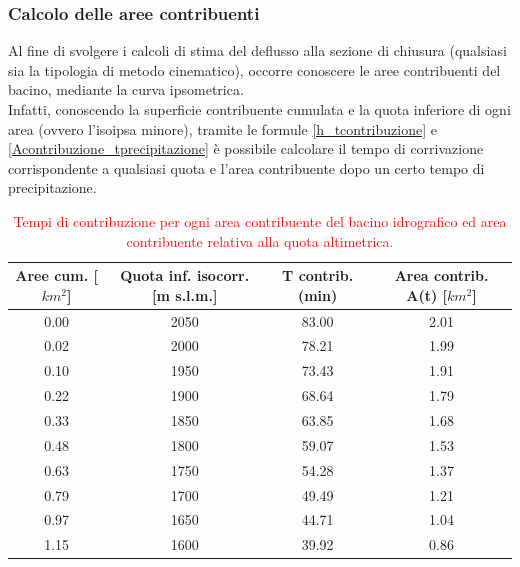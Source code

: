\subsubsection{Calcolo delle aree contribuenti}
Al fine di svolgere i calcoli di stima del deflusso alla sezione di chiusura (qualsiasi sia la tipologia di metodo cinematico), occorre conoscere le aree contribuenti del bacino, mediante la curva ipsometrica.\\
Infatti, conoscendo la superficie contribuente cumulata e la quota inferiore di ogni area (ovvero l'isoipsa minore), tramite le formule \ref{h_tcontribuzione} e \ref{Acontribuzione_tprecipitazione} è possibile calcolare il tempo di corrivazione corrispondente a qualsiasi quota e l'area contribuente dopo un certo tempo di precipitazione.
\begin{table}[H] \centering
\caption{\textcolor{red}{Tempi di contribuzione per ogni area contribuente del bacino idrografico ed area contribuente relativa alla quota altimetrica.}}
    \begin{tabular}{cccc}
\toprule
Aree cum. [$km^2$]& Quota inf. isocorr. [m s.l.m.] &  T contrib. (min) & Area contrib. A(t) [$km^2$] \\
\midrule
    0.00          & 2050                       & 83.00                       & 2.01                   \\
    0.02          & 2000                       & 78.21                       & 1.99                   \\
    0.10          & 1950                       & 73.43                       & 1.91                   \\
    0.22          & 1900                       & 68.64                       & 1.79                   \\
    0.33          & 1850                       & 63.85                       & 1.68                   \\
    0.48          & 1800                       & 59.07                       & 1.53                   \\
    0.63          & 1750                       & 54.28                       & 1.37                   \\
    0.79          & 1700                       & 49.49                       & 1.21                   \\
    0.97          & 1650                       & 44.71                       & 1.04                   \\
    1.15          & 1600                       & 39.92                       & 0.86                   \\

\end{tabular}
\end{table}
